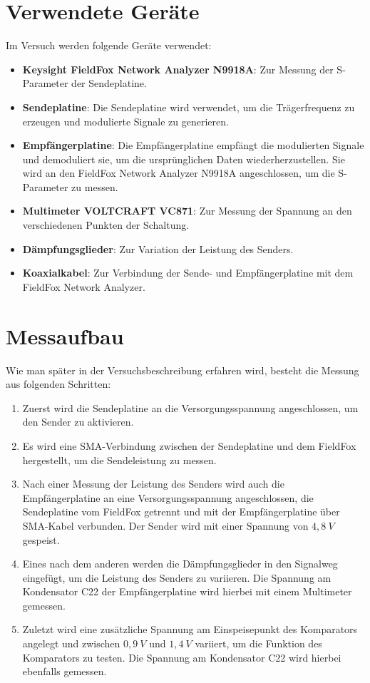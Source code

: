 \section{Verwendete Geräte}
Im Versuch werden folgende Geräte verwendet:
\begin{itemize}
    \item \textbf{Keysight FieldFox Network Analyzer N9918A}: Zur Messung der S-Parameter der Sendeplatine.
    \item \textbf{Sendeplatine}: Die Sendeplatine wird verwendet, um die Trägerfrequenz zu erzeugen und modulierte Signale zu generieren.
    \item \textbf{Empfängerplatine}: Die Empfängerplatine empfängt die modulierten Signale und demoduliert sie, um die ursprünglichen Daten wiederherzustellen. Sie wird an den FieldFox Network Analyzer N9918A angeschlossen, um die S-Parameter zu messen.
    \item \textbf{Multimeter VOLTCRAFT VC871}: Zur Messung der Spannung an den verschiedenen Punkten der Schaltung.
    \item \textbf{Dämpfungsglieder}: Zur Variation der Leistung des Senders.
    \item \textbf{Koaxialkabel}: Zur Verbindung der Sende- und Empfängerplatine mit dem FieldFox Network Analyzer.
\end{itemize}
\section{Messaufbau}
Wie man später in der Versuchsbeschreibung erfahren wird, besteht die Messung aus folgenden Schritten:
\begin{enumerate}
    \item Zuerst wird die Sendeplatine an die Versorgungsspannung angeschlossen, um den Sender zu aktivieren.
    \item Es wird eine SMA-Verbindung zwischen der Sendeplatine und dem FieldFox hergestellt, um die Sendeleistung zu messen.
    \item Nach einer Messung der Leistung des Senders wird auch die Empfängerplatine an eine Versorgungsspannung angeschlossen, die Sendeplatine vom FieldFox getrennt und mit der Empfängerplatine über SMA-Kabel verbunden. Der Sender wird mit einer Spannung von $4,8~V$ gespeist.
    \item Eines nach dem anderen werden die Dämpfungsglieder in den Signalweg eingefügt, um die Leistung des Senders zu variieren. Die Spannung am Kondensator C22 der Empfängerplatine wird hierbei mit einem Multimeter gemessen.
    \item Zuletzt wird eine zusätzliche Spannung am Einspeisepunkt des Komparators angelegt und zwischen $0,9~V$ und $1,4~V$ variiert, um die Funktion des Komparators zu testen. Die Spannung am Kondensator C22 wird hierbei ebenfalls gemessen.
\end{enumerate}
\clearpage
